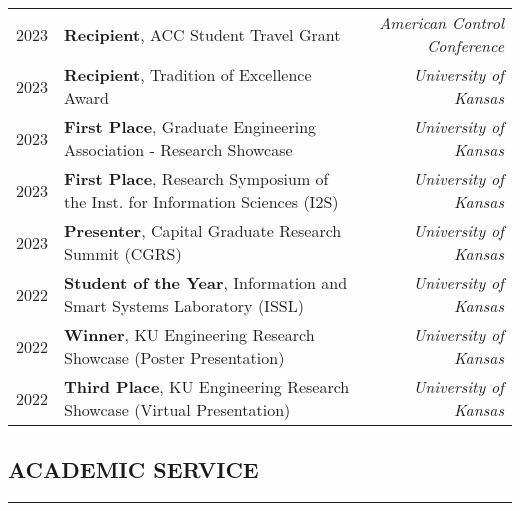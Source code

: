 \documentclass[10pt,letter]{article}
\begin{document}
\begin{small}
{\renewcommand{\arraystretch}{1.25}
\begin{tabular}{llr}
 2023 & \textbf{Recipient}, ACC Student Travel Grant & \textit{American Control Conference} \\
 2023 & \textbf{Recipient}, Tradition of Excellence Award & \textit{University of Kansas} \\
 2023 & \textbf{First Place}, Graduate Engineering Association - Research Showcase & \textit{University of Kansas} \\
 2023 & \textbf{First Place}, Research Symposium of the Inst. for Information Sciences (I2S) & \textit{University of Kansas} \\
 2023 & \textbf{Presenter}, Capital Graduate Research Summit (CGRS) & \textit{University of Kansas} \\
 2022 & \textbf{Student of the Year}, Information and Smart Systems Laboratory (ISSL) & \textit{University of Kansas} \\
 2022 & \textbf{Winner}, KU Engineering Research Showcase (Poster Presentation) & \textit{University of Kansas} \\
 2022 & \textbf{Third Place}, KU Engineering Research Showcase (Virtual Presentation) & \textit{University of Kansas} \\
\end{tabular}
}



\subsection*{ACADEMIC SERVICE}
\hrule
\vspace{0.2cm}


\end{small}
\end{document}
